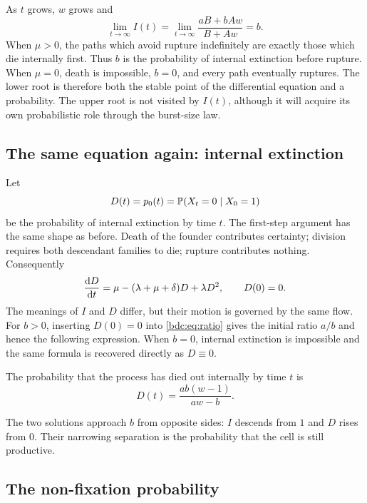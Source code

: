 As $t$ grows, $w$ grows and
\[
\lim_{t\to\infty}I(t)
=\lim_{t\to\infty}\frac{aB+bAw}{B+Aw}=b.
\]
When $\mu>0$, the paths which avoid rupture indefinitely are exactly those which
die internally first. Thus $b$ is the probability of internal extinction before
rupture. When $\mu=0$, death is impossible, $b=0$, and every path eventually
ruptures. The lower root is therefore both the stable point of the differential
equation and a probability. The upper root is not visited by $I(t)$, although it
will acquire its own probabilistic role through the burst-size law.

\subsection{The same equation again: internal extinction}
\label{bdc:sec:D}

Let
\[
D(t)=p_0(t)=\mathbb{P}\!\left(X_t=0\mid X_0=1\right)
\]
be the probability of internal extinction by time $t$. The first-step argument
has the same shape as before. Death of the founder contributes certainty;
division requires both descendant families to die; rupture contributes nothing.
Consequently
\begin{equation}
\label{bdc:eq:riccatiD}
\frac{\mathrm{d} D}{\mathrm{d} t} = \mu - (\lambda+\mu+\delta)D + \lambda D^2,
\qquad D(0)=0.
\end{equation}
The meanings of $I$ and $D$ differ, but their motion is governed by the same
flow. For $b>0$, inserting $D(0)=0$ into \cref{bdc:eq:ratio} gives the initial
ratio $a/b$ and hence the following expression. When $b=0$, internal extinction
is impossible and the same formula is recovered directly as $D\equiv0$.

\begin{theorem}
\label{bdc:thm:D}
The probability that the process has died out internally by time $t$ is
\begin{equation}
\label{bdc:eq:D}
D(t) = \frac{ab(w-1)}{aw-b}.
\end{equation}
\end{theorem}

The two solutions approach $b$ from opposite sides: $I$ descends from $1$ and
$D$ rises from $0$. Their narrowing separation is the probability that the cell
is still productive.

\subsection{The non-fixation probability}
\label{bdc:sec:Ifix}

